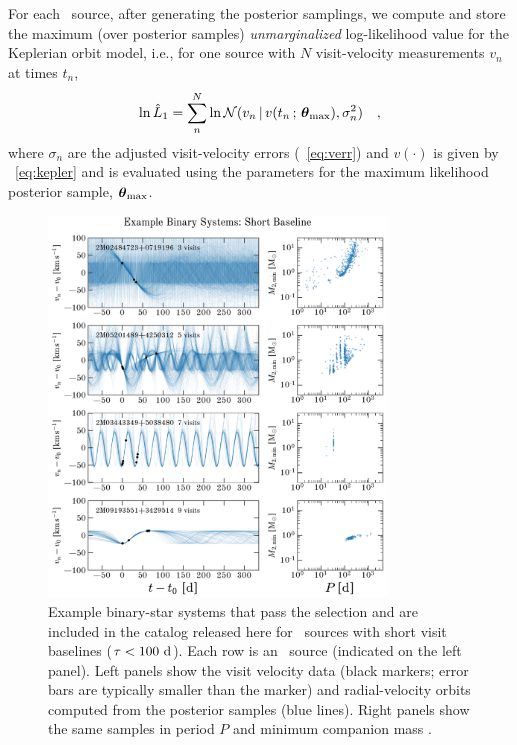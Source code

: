\documentclass[modern]{aastex63}
\begin{document}
For each \apogee\ source, after generating the posterior samplings, we compute
and store the maximum (over posterior samples) \emph{unmarginalized}
log-likelihood value for the Keplerian orbit model, i.e., for one source with
$N$ visit-velocity measurements $v_n$ at times $t_n$,
\begin{equation}
    \ln \hat{L}_1 = \sum_n^N \ln \mathcal{N}(v_n \given
        v(t_n \,;\, \bs{\theta}_{\mathrm{max}}), \sigma_n^2) \quad ,
\end{equation}
where $\sigma_n$ are the adjusted visit-velocity errors
(\equationname~\ref{eq:verr}) and $v(\cdot)$ is given by
\equationname~\ref{eq:kepler} and is evaluated using the parameters for the
maximum likelihood posterior sample, $\boldsymbol{\theta}_{\mathrm{max}}$.

\begin{figure}[!t]
    \begin{center}
    \includegraphics[width=0.8\textwidth]{example-binaries-short.pdf}
    \end{center}
    \caption{%
    Example binary-star systems that pass the selection and are included in the
    catalog released here for \apogee\ sources with short visit baselines
    ($\tau < 100~\mathrm{d}$).
    Each row is an \apogee\ source (indicated on the left panel).
    Left panels show the visit velocity data (black markers; error bars are
    typically smaller than the marker) and radial-velocity orbits computed from
    the posterior samples (blue lines).
    Right panels show the same samples in period $P$ and minimum companion mass
    \mtwomin.
    \label{fig:binary-examples-short}
    }
\end{figure}
\end{document}
